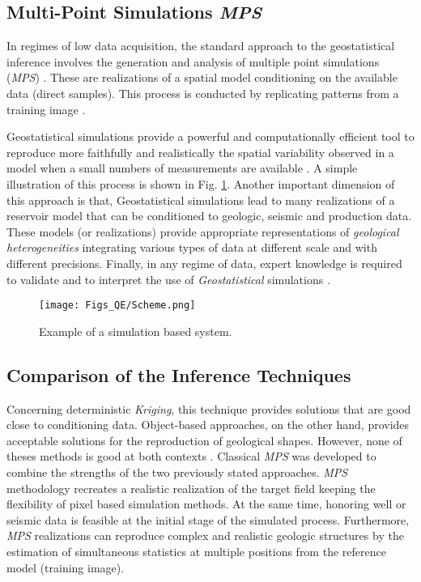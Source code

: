 \subsection{Multi-Point Simulations \emph{MPS}}

In regimes of low data acquisition, the standard approach to the geostatistical inference involves the generation and analysis of multiple point simulations (\emph{MPS}) \citep{Scheidt2009_a, Ortiz_2004_a, huang_2013_a}. These are realizations of a spatial model conditioning on the available data (direct samples). This process is conducted by replicating patterns from a training image \citep{Ortiz_2004_a,Remy_2009_a}. 

Geostatistical simulations provide a powerful and computationally efficient tool to reproduce more faithfully and realistically the spatial variability observed in a model when a small numbers of measurements are available \citep{Remy_2009_a,Ortiz_2004_a}. A simple illustration of this process is shown in Fig. \ref{fig:MPSExample}. Another important dimension of this approach is that, Geostatistical simulations lead to many realizations of a reservoir model that can be conditioned to geologic, seismic and production data. These models (or realizations) provide appropriate representations of \textit{geological heterogeneities} integrating various types of data at different scale and with different precisions. Finally, in any regime of data, expert knowledge is required to validate and to interpret the use of \emph{Geostatistical} simulations \citep{Oliver_2008_a, Bangerth_2006}. 


	\begin{figure}[H]
	\centering
	\texttt{[image: Figs\_QE/Scheme.png]}

	\caption{Example of a simulation based system.}
	\label{fig:MPSExample}
	\end{figure}

\subsection{Comparison of the Inference Techniques}

Concerning deterministic \emph{Kriging}, this technique provides solutions that are good close to conditioning data. Object-based approaches, on the other hand, provides acceptable solutions for the reproduction of geological shapes. However, none of theses methods is good at both contexts \citep{Lam_1983_a,Ortiz_2004_a,Bangerth_2005,olea1984_a}. Classical \emph{MPS} was developed to combine the strengths of the two previously stated approaches. \emph{MPS} methodology recreates a realistic realization of the target field keeping the flexibility of pixel based simulation methods. At the same time, honoring well or seismic data is feasible at the initial stage of the simulated process. Furthermore, \emph{MPS} realizations can reproduce complex and realistic geologic structures by the estimation of simultaneous statistics at multiple positions from the reference model (training image).

